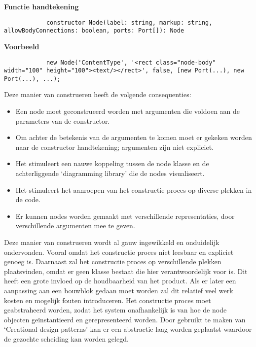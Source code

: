         \textbf{Functie handtekening}
        \lstset{language=JavaScript,breaklines=true}
        \begin{lstlisting}
            constructor Node(label: string, markup: string, allowBodyConnections: boolean, ports: Port[]): Node
        \end{lstlisting}

        \textbf{Voorbeeld}
        \lstset{language=JavaScript,breaklines=true}
        \begin{lstlisting}
            new Node('ContentType', '<rect class="node-body" width="100" height="100"><text/></rect>', false, [new Port(...), new Port(...), ...);
        \end{lstlisting}

\noindent Deze manier van construeren heeft de volgende consequenties:
\begin{itemize}
    \item Een node moet geconstrueerd worden met argumenten die voldoen aan de parameters van de constructor. 
    \item Om achter de betekenis van de argumenten te komen moet er gekeken worden naar de constructor handtekening; argumenten zijn niet expliciet.
    \item Het stimuleert een nauwe koppeling tussen de node klasse en de achterliggende ‘diagramming library’ die de nodes visualiseert.
    \item Het stimuleert het aanroepen van het constructie proces op diverse plekken in de code.
    \item Er kunnen nodes worden gemaakt met verschillende representaties, door verschillende argumenten mee te geven.
\end{itemize}

\noindent Deze manier van construeren wordt al gauw ingewikkeld en onduidelijk ondervonden. Vooral omdat het constructie proces niet leesbaar en expliciet genoeg is. Daarnaast zal het constructie proces op verschillende plekken plaatsvinden, omdat er geen klasse bestaat die hier verantwoordelijk voor is. Dit heeft een grote invloed op de houdbaarheid van het product. Als er later een aanpassing aan een bouwblok gedaan moet worden zal dit relatief veel werk kosten en mogelijk fouten introduceren. Het constructie proces moet geabstraheerd worden, zodat het system onafhankelijk is van hoe de node objecten geïnstantieerd en gerepresenteerd worden. Door gebruikt te maken van ‘Creational design patterns’ kan er een abstractie laag worden geplaatst waardoor de gezochte scheiding kan worden gelegd\cite{DesignPatterns}.

